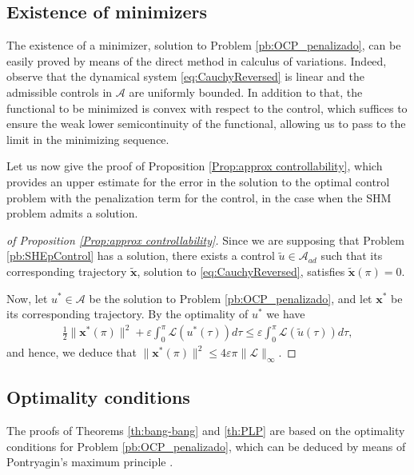 \documentclass[9pt,shortpaper,twoside,web]{ieeecolor}
\begin{document}
\subsection{Existence of minimizers}\label{sec: exist mini}

The existence of a minimizer, solution to Problem \ref{pb:OCP_penalizado}, can be easily proved by means of the direct method in calculus of variations. Indeed, observe that the dynamical system \eqref{eq:CauchyReversed} is linear and the admissible controls in $\mathcal{A}$ are uniformly bounded.
In addition to that, the functional to be minimized is convex with respect to the control, which suffices to ensure the weak lower semicontinuity of the functional, allowing us to pass to the limit in the minimizing sequence.

Let us now give the proof of Proposition \ref{Prop:approx controllability}, which provides an upper estimate for the error in the solution to the optimal control problem with the penalization term for the control, in the case when the SHM problem admits a solution. 

\medskip 
\begin{proof}[of Proposition \ref{Prop:approx controllability}]
	Since we are supposing that Problem \ref{pb:SHEpControl} has a solution, there exists a control $\tilde{u}\in \mathcal{A}_{ad}$ such that its corresponding trajectory $\tilde{\bm{x}}$, solution to \eqref{eq:CauchyReversed}, satisfies $\tilde{\bm{x}}(\pi) = 0$. 
	
	Now, let $u^\ast\in \mathcal{A}$ be the solution to Problem \ref{pb:OCP_penalizado}, and let $\bm{x}^\ast$ be its corresponding trajectory. By the optimality of $u^\ast$ we have
	\begin{align*}
		\frac{1}{2} \| \bm{x}^\ast(\pi)\|^2 +\varepsilon \int_0^\pi \mathcal{L}(u^\ast(\tau))d\tau \leq \varepsilon \int_0^\pi \mathcal{L}(\tilde{u}(\tau))d\tau,
	\end{align*}
	and hence, we deduce that $\| \bm{x}^\ast (\pi)\|^2 \leq 4 \varepsilon \pi \| \mathcal{L}\|_\infty.$
\end{proof}

\subsection{Optimality conditions}\label{sec:opti cond}

The proofs of Theorems \ref{th:bang-bang} and \ref{th:PLP} are based on the optimality conditions for Problem \ref{pb:OCP_penalizado}, which can be deduced by means of Pontryagin's maximum principle \cite[Chapter~2.7]{bryson1975applied}.
\end{document}
